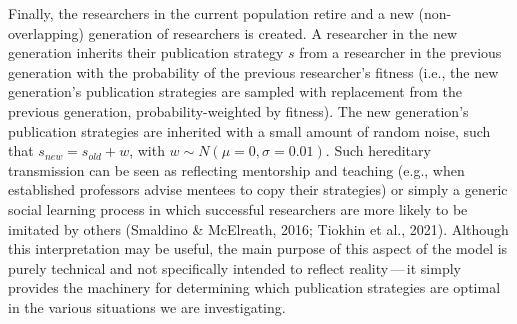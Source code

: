 \documentclass[
  british,
  a4paper,
  ,man,mask,floatsintext]{apa6}
\begin{document}
Finally, the researchers in the current population retire and a new (non-overlapping) generation of researchers is created.
A researcher in the new generation inherits their publication strategy \(s\) from a researcher in the previous generation with the probability of the previous researcher's fitness (i.e., the new generation's publication strategies are sampled with replacement from the previous generation, probability-weighted by fitness).
The new generation's publication strategies are inherited with a small amount of random noise, such that \(s_{new} = s_{old} + w\), with \(w \sim N(\mu = 0, \sigma = 0.01)\).
Such hereditary transmission can be seen as reflecting mentorship and teaching (e.g., when established professors advise mentees to copy their strategies) or simply a generic social learning process in which successful researchers are more likely to be imitated by others (Smaldino \& McElreath, 2016; Tiokhin et al., 2021).
Although this interpretation may be useful, the main purpose of this aspect of the model is purely technical and not specifically intended to reflect reality\(\,\)---\(\,\)it simply provides the machinery for determining which publication strategies are optimal in the various situations we are investigating.
\end{document}
